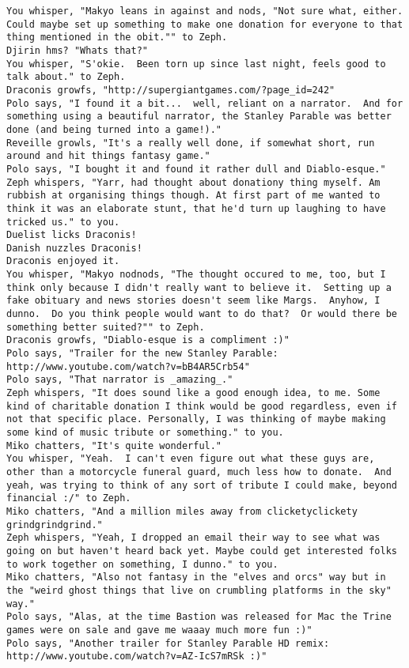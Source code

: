 \begin{verbatim}
You whisper, "Makyo leans in against and nods, "Not sure what, either.  Could maybe set up something to make one donation for everyone to that thing mentioned in the obit."" to Zeph.
Djirin hms? "Whats that?"
You whisper, "S'okie.  Been torn up since last night, feels good to talk about." to Zeph.
Draconis growfs, "http://supergiantgames.com/?page_id=242"
Polo says, "I found it a bit...  well, reliant on a narrator.  And for something using a beautiful narrator, the Stanley Parable was better done (and being turned into a game!)."
Reveille growls, "It's a really well done, if somewhat short, run around and hit things fantasy game."
Polo says, "I bought it and found it rather dull and Diablo-esque."
Zeph whispers, "Yarr, had thought about donationy thing myself. Am rubbish at organising things though. At first part of me wanted to think it was an elaborate stunt, that he'd turn up laughing to have tricked us." to you.
Duelist licks Draconis!
Danish nuzzles Draconis!
Draconis enjoyed it.
You whisper, "Makyo nodnods, "The thought occured to me, too, but I think only because I didn't really want to believe it.  Setting up a fake obituary and news stories doesn't seem like Margs.  Anyhow, I dunno.  Do you think people would want to do that?  Or would there be something better suited?"" to Zeph.
Draconis growfs, "Diablo-esque is a compliment :)"
Polo says, "Trailer for the new Stanley Parable: http://www.youtube.com/watch?v=bB4AR5Crb54"
Polo says, "That narrator is _amazing_."
Zeph whispers, "It does sound like a good enough idea, to me. Some kind of charitable donation I think would be good regardless, even if not that specific place. Personally, I was thinking of maybe making some kind of music tribute or something." to you.
Miko chatters, "It's quite wonderful."
You whisper, "Yeah.  I can't even figure out what these guys are, other than a motorcycle funeral guard, much less how to donate.  And yeah, was trying to think of any sort of tribute I could make, beyond financial :/" to Zeph.
Miko chatters, "And a million miles away from clicketyclickety grindgrindgrind."
Zeph whispers, "Yeah, I dropped an email their way to see what was going on but haven't heard back yet. Maybe could get interested folks to work together on something, I dunno." to you.
Miko chatters, "Also not fantasy in the "elves and orcs" way but in the "weird ghost things that live on crumbling platforms in the sky" way."
Polo says, "Alas, at the time Bastion was released for Mac the Trine games were on sale and gave me waaay much more fun :)"
Polo says, "Another trailer for Stanley Parable HD remix: http://www.youtube.com/watch?v=AZ-IcS7mRSk :)"

\end{verbatim}
